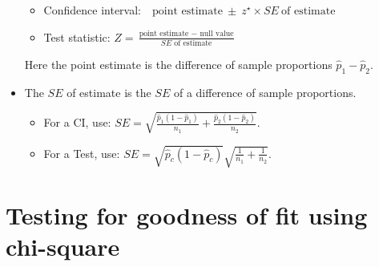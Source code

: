 \begin{itemize}
\begin{itemize}
\setlength{\itemsep}{2mm}
\item[] Confidence interval:\ \  $\text{point estimate}\ \pm\ z^{\star} \times SE\ \text{of estimate}$
\item[] Test statistic:  $Z = \frac{\text{point estimate } - \text{ null value}}{SE \text{ of estimate}}$ 
\end{itemize}
Here the point estimate is the difference of sample proportions $\hat{p}_1 - \hat{p}_2$.
\item[] The $SE$ of estimate is the $SE$ of a difference of sample proportions.
\begin{itemize}
\setlength{\itemsep}{0mm}
\item For a CI, use:  $SE = \sqrt{\frac{\hat{p}_1(1-\hat{p}_1)}{n_1} + \frac{\hat{p}_2(1-\hat{p}_2)}{n_2}}$.
\item For a Test, use:  $SE = \sqrt{\hat{p}_c(1-\hat{p}_c)}\sqrt{\frac{1}{n_1} + \frac{1}{n_2}}$.   
\end{itemize}

\end{itemize}


{}


\section[Testing for goodness of fit using chi-square]{Testing for goodness of fit using chi-square }

\label{oneWayChiSquare}

